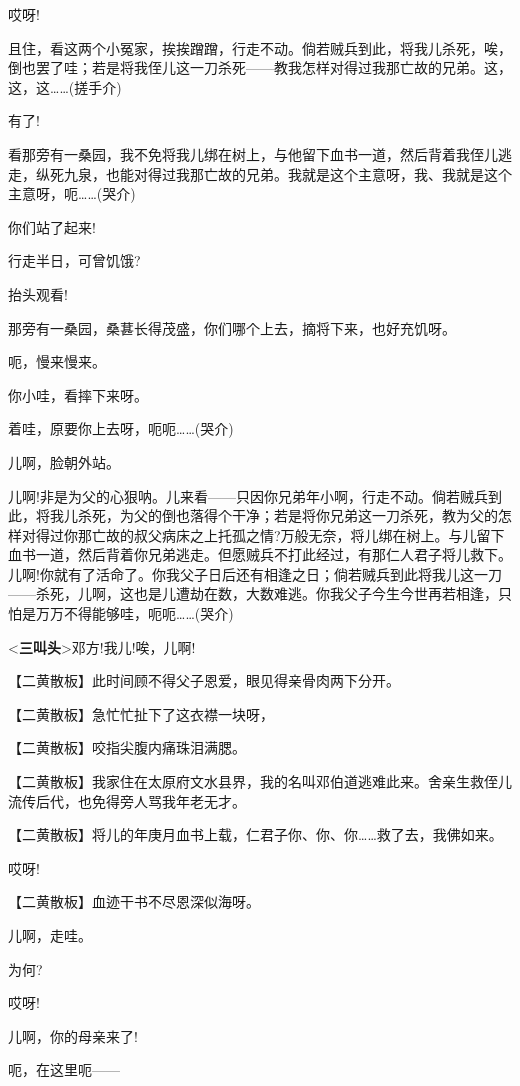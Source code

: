 哎呀!

且住，看这两个小冤家，挨挨蹭蹭，行走不动。倘若贼兵到此，将我儿杀死，唉，倒也罢了哇；若是将我侄儿这一刀杀死------教我怎样对得过我那亡故的兄弟。这，这，这\ldots{}\ldots{}(搓手介)

有了!

看那旁有一桑园，我不免将我儿绑在树上，与他留下血书一道，然后背着我侄儿逃走，纵死九泉，也能对得过我那亡故的兄弟。我就是这个主意呀，我、我就是这个主意呀，呃\ldots{}\ldots{}(哭介)

你们站了起来!

行走半日，可曾饥饿?

抬头观看!

那旁有一桑园，桑葚长得茂盛，你们哪个上去，摘将下来，也好充饥呀。

呃，慢来慢来。

你小哇，看摔下来呀。

着哇，原要你上去呀，呃呃\ldots{}\ldots{}(哭介)

儿啊，脸朝外站。

儿啊!非是为父的心狠呐。儿来看------只因你兄弟年小啊，行走不动。倘若贼兵到此，将我儿杀死，为父的倒也落得个干净；若是将你兄弟这一刀杀死，教为父的怎样对得过你那亡故的叔父病床之上托孤之情?万般无奈，将儿绑在树上。与儿留下血书一道，然后背着你兄弟逃走。但愿贼兵不打此经过，有那仁人君子将儿救下。儿啊!你就有了活命了。你我父子日后还有相逢之日；倘若贼兵到此将我儿这一刀------杀死，儿啊，这也是儿遭劫在数，大数难逃。你我父子今生今世再若相逢，只怕是万万不得能够哇，呃呃\ldots{}\ldots{}(哭介)

\textless{}\textbf{三叫头}\textgreater{}邓方!我儿!唉，儿啊!

【二黄散板】此时间顾不得父子恩爱，眼见得亲骨肉两下分开。

【二黄散板】急忙忙扯下了这衣襟一块呀，

【二黄散板】咬指尖腹内痛珠泪满腮。

【二黄散板】我家住在太原府文水县界，我的名叫邓伯道逃难此来。舍亲生救侄儿流传后代，也免得旁人骂我年老无才。

【二黄散板】将儿的年庚月血书上载，仁君子你、你、你\ldots{}\ldots{}救了去，我佛如来。

哎呀!

【二黄散板】血迹干书不尽恩深似海呀。

儿啊，走哇。

为何?

哎呀!

儿啊，你的母亲来了!

呃，在这里呃------

